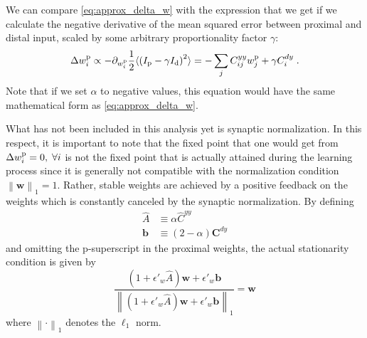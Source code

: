 \documentclass[10pt,a4paper,draft]{article}
\newcommand{\avg}[1]{\langle #1 \rangle}
\begin{document}
We can compare \eqref{eq:approx_delta_w} with the expression that we get if we calculate the negative derivative of the mean squared error between proximal and distal input, scaled by some arbitrary proportionality factor $\gamma$:
\begin{equation}
\Delta w^{\rm p}_{i} \propto -\partial_{w^{\rm p}_{i}} \frac{1}{2}\avg{\left( I_{\rm p} -\gamma I_{\rm d} \right)^2} = -\sum_j C^{yy}_{ij} w^{\rm p}_{j} + \gamma C^{dy}_i \; . \label{eq:mse_diff}
\end{equation} 
Note that if we set $\alpha$ to negative values, this equation would have the same mathematical form as \eqref{eq:approx_delta_w}.

What has not been included in this analysis yet is synaptic normalization. In this respect, it is important to note that the fixed point that one would get from $\Delta w^{\rm p}_{i} = 0, \; \forall i$ is not the fixed point that is actually attained during the learning process since it is generally not compatible with the normalization condition $\left\lVert \mathbf{w} \right\rVert_1 = 1$. Rather, stable weights are achieved by a positive feedback on the weights which is constantly canceled by the synaptic normalization. By defining
\begin{align}
	\widehat{A} &\equiv \alpha \widehat{C}^{yy} \\
	\mathbf{b} &\equiv (2-\alpha) \mathbf{C}^{dy}
\end{align}
and omitting the p-superscript in the proximal weights, the actual stationarity condition is given by
\begin{equation}
	\frac{\left(1 + \epsilon'_w \widehat{A}\right)\mathbf{w} + \epsilon'_w \mathbf{b}}{\left\lVert \left(1 + \epsilon'_w \widehat{A}\right)\mathbf{w} + \epsilon'_w \mathbf{b} \right\rVert_1} = \mathbf{w} \label{eq:stab_cond_w}
\end{equation}
where $\left\lVert \cdot \right\rVert_1$ denotes the $\ell_1$ norm.
\end{document}
